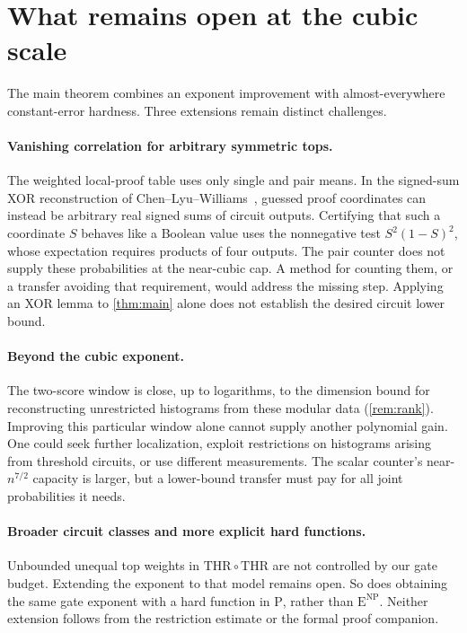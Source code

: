 \documentclass[11pt,letterpaper]{article}
\theoremstyle{definition}
\theoremstyle{remark}
\newcommand{\THR}{\mathrm{THR}}
\newcommand{\ENP}{\mathrm{E}^{\mathrm{NP}}}
\begin{document}
\section{What remains open at the cubic scale}\label{sec:scope}

The main theorem combines an exponent improvement with
almost-everywhere constant-error hardness. Three extensions remain
distinct challenges.

\paragraph{Vanishing correlation for arbitrary symmetric tops.}
The weighted local-proof table uses only single and pair means. In the
signed-sum XOR reconstruction of Chen--Lyu--Williams~\cite{CLW20},
guessed proof coordinates can instead be arbitrary real signed sums
of circuit outputs. Certifying that such a coordinate \(S\) behaves
like a Boolean value uses the nonnegative test \(S^2(1-S)^2\), whose
expectation requires products of four outputs. The pair counter does
not supply these probabilities at the near-cubic cap. A method for
counting them, or a transfer avoiding that requirement, would address
the missing step. Applying an XOR lemma to \cref{thm:main} alone does
not establish the desired circuit lower bound.

\paragraph{Beyond the cubic exponent.}
The two-score window is close, up to logarithms, to the dimension
bound for reconstructing unrestricted histograms from these modular
data (\cref{rem:rank}). Improving this particular window alone cannot
supply another polynomial gain. One could seek further localization,
exploit restrictions on histograms arising from threshold circuits,
or use different measurements. The scalar counter's near-\(n^{7/2}\)
capacity is larger, but a lower-bound transfer must pay for all joint
probabilities it needs.

\paragraph{Broader circuit classes and more explicit hard functions.}
Unbounded unequal top weights in \(\THR\circ\THR\) are not controlled
by our gate budget. Extending the exponent to that model remains
open. So does obtaining the same gate exponent with a hard function
in \(\mathrm P\), rather than \(\ENP\). Neither extension follows
from the restriction estimate or the formal proof companion.
\end{document}
